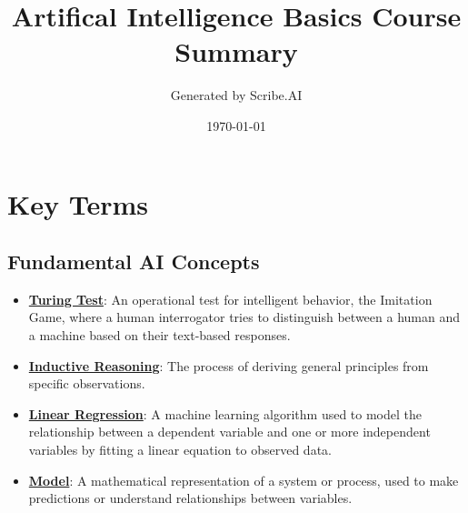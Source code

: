 \documentclass{article}%
\title{Artifical Intelligence Basics Course Summary}%
\author{Generated by Scribe.AI}%
\date{\today}%
\begin{document}
%
\normalsize%
\maketitle%
\section{Key Terms}%
\label{sec:KeyTerms}%
\subsection{Fundamental AI Concepts}%
\label{subsec:FundamentalAIConcepts}%
\begin{itemize}[leftmargin=*]%
\item \href{https://purdue.brightspace.com/d2l/common/assets/pdfjs-d2l-dist/1.0.14-legacy/web/viewer.html?file=%2Fcontent%2Fenforced%2F1095467-wl.202510.CS.24300.001%2F02L2-Intro.pdf%3Fou%3D1095467&lang=en-us&container=d2l-fileviewer-rendered-pdf&fullscreen=d2l-fileviewer-rendered-pdf-dialog&height=667#page=6}{\textbf{Turing Test}}: An operational test for intelligent behavior, the Imitation Game, where a human interrogator tries to distinguish between a human and a machine based on their text-based responses.%
\item \href{https://purdue.brightspace.com/d2l/common/assets/pdfjs-d2l-dist/1.0.14-legacy/web/viewer.html?file=%2Fcontent%2Fenforced%2F1095467-wl.202510.CS.24300.001%2F05L2-ML Basics.pdf%3Fou%3D1095467&lang=en-us&container=d2l-fileviewer-rendered-pdf&fullscreen=d2l-fileviewer-rendered-pdf-dialog&height=667#page=3}{\textbf{Inductive Reasoning}}: The process of deriving general principles from specific observations.%
\item \href{https://purdue.brightspace.com/d2l/common/assets/pdfjs-d2l-dist/1.0.14-legacy/web/viewer.html?file=%2Fcontent%2Fenforced%2F1095467-wl.202510.CS.24300.001%2F05L2-ML Basics.pdf%3Fou%3D1095467&lang=en-us&container=d2l-fileviewer-rendered-pdf&fullscreen=d2l-fileviewer-rendered-pdf-dialog&height=667#page=6}{\textbf{Linear Regression}}: A machine learning algorithm used to model the relationship between a dependent variable and one or more independent variables by fitting a linear equation to observed data.%
\item \href{https://purdue.brightspace.com/d2l/common/assets/pdfjs-d2l-dist/1.0.14-legacy/web/viewer.html?file=%2Fcontent%2Fenforced%2F1095467-wl.202510.CS.24300.001%2F05L2-ML Basics.pdf%3Fou%3D1095467&lang=en-us&container=d2l-fileviewer-rendered-pdf&fullscreen=d2l-fileviewer-rendered-pdf-dialog&height=667#page=5}{\textbf{Model}}: A mathematical representation of a system or process, used to make predictions or understand relationships between variables.%

\end{itemize}
\end{document}
